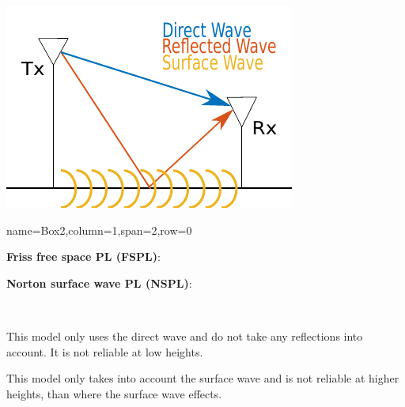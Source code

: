 \documentclass[a0paper,landscape]{baposter}
\begin{document}
\begin{poster}
{\begin{center}
\includegraphics[scale=0.8]{pix/poster_cropped.pdf}
\label{fig:name}
\end{center}

}




{name=Box2,column=1,span=2,row=0}{
\large

\begin{minipage}{.45\textwidth}
\textcolor{thomasred}{\textbf{Friss free space PL (FSPL)}:}
\end{minipage}%
\hspace{1cm}
\begin{minipage}{0.45\textwidth}
\textcolor{thomasyellow}{\textbf{Norton surface wave PL (NSPL)}:}
\end{minipage} \\


\begin{minipage}{0.45\textwidth}
This model only uses the direct wave and do not take any reflections into account. It is not reliable at low heights. 
\end{minipage}%
\hspace{1cm}
\begin{minipage}{0.45\textwidth}
This model only takes into account the surface wave and is not reliable at higher heights, than where the surface wave effects.
\end{minipage} \\

}
\end{poster}
\end{document}
